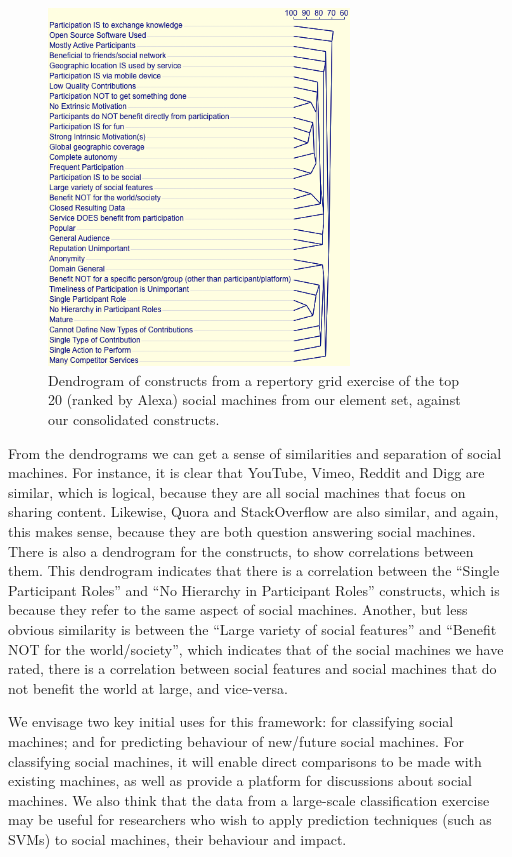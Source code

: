 \documentclass{sig-alternate}
\begin{document}
\begin{figure}[htb]
\begin{center}
\includegraphics[width=8cm]{img/dendrogram-constructs.png}
\caption{Dendrogram of constructs from a repertory grid exercise of the top 20 (ranked by Alexa) social machines from our element set, against our consolidated constructs.} \label{dendrogram}
\end{center}
\end{figure}

From the dendrograms we can get a sense of similarities and separation of social machines. For
instance, it is clear that YouTube, Vimeo, Reddit and Digg are similar, which is logical, because
they are all social machines that focus on sharing content. Likewise, Quora and StackOverflow
are also similar, and again, this makes sense, because they are both question answering social
machines. There is also a dendrogram for the constructs, to show correlations between them. This
dendrogram indicates that there is a correlation between the ``Single Participant Roles'' and
``No Hierarchy in Participant Roles'' constructs, which is because they refer to the same
aspect of social machines. Another, but less obvious similarity is between the ``Large variety of
social features'' and ``Benefit NOT for the world/society'', which indicates that of the social
machines we have rated, there is a correlation between social features and social machines that
do not benefit the world at large, and vice-versa.

We envisage two key initial uses for this framework: for classifying social machines; and for
predicting behaviour of new/future social machines. For classifying social machines, it will
enable direct comparisons to be made with existing machines, as well as provide a platform
for discussions about social machines. We also think that the data from a large-scale classification
exercise may be useful for researchers who wish to apply prediction techniques (such as SVMs)
to social machines, their behaviour and impact.
\end{document}
